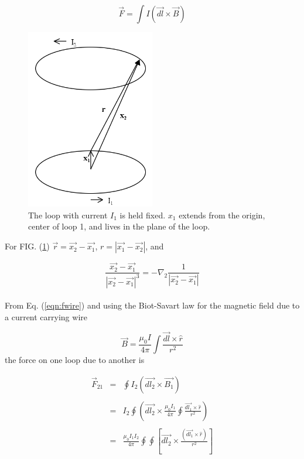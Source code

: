 \documentclass[12pt]{revtex4}
\begin{document}
\begin{equation}
\vec{F}=\int I (\vec{dl} \times \vec{B}) \label{eqn:fwire}
\end{equation}

 \begin{figure}[h]
\begin{center}
\includegraphics[width=0.5\textwidth]{rx.png} 
\end{center}
\caption{\label{fig:rx} The loop with current $I_1$ is held fixed.  $x_1$ extends from the origin, center of loop 1, and lives in the plane of the loop.}
\end{figure}      

For FIG. (\ref{fig:rx}) $\vec{r}=\vec{x_2}-\vec{x_1}$, $r=| \vec{x_1}-\vec{x_2}|$, and 

\begin{equation}
\frac{\vec{x_2}-\vec{x_1}}{| \vec{x_2}-\vec{x_1}|^3}=-\nabla_2 \frac{1}{| \vec{x_2}-\vec{x_1}|}  \label{eqn:negdel}
\end{equation}
\\
From Eq. (\ref{eqn:fwire}) and using the Biot-Savart law for the magnetic field due to a current carrying wire

\begin{equation}
\vec{B}=\frac{\mu_{0}I}{4\pi} \int \frac{\vec{dl} \times \hat{r}}{r^{2}} \label{eqn:biot}
\end{equation}
the force on one loop due to another is 

\begin{eqnarray*}
\vec{F}_{21}&=&\oint I_{2} (\vec{dl_{2}} \times \vec{B_{1}})\\  \\ 
&=&I_{2} \oint (\vec{dl_{2}} \times \frac{\mu_{0}I_{1}}{4\pi} \oint \frac{\vec{dl_{1}} \times \hat{r}}{r^{2}})\\  \\ 
&=&\frac{\mu_{0}I_{1}I_{2}  }{4\pi} \oint \oint \left[\vec{dl_{2}} \times  \frac{(\vec{dl_{1}} \times \hat{r})}{r^{2}}\right]\\  \\
\end{eqnarray*}
\end{document}
